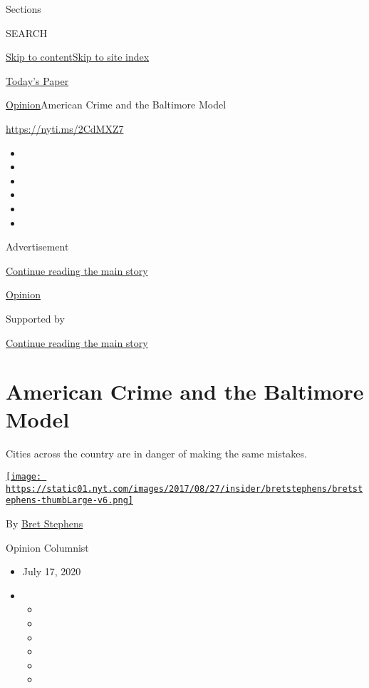 Sections

SEARCH

\protect\hyperlink{site-content}{Skip to
content}\protect\hyperlink{site-index}{Skip to site index}

\href{https://myaccount.nytimes.com/auth/login?response_type=cookie\&client_id=vi}{}

\href{https://www.nytimes.com/section/todayspaper}{Today's Paper}

\href{/section/opinion}{Opinion}\textbar{}American Crime and the
Baltimore Model

\href{https://nyti.ms/2CdMXZ7}{https://nyti.ms/2CdMXZ7}

\begin{itemize}
\item
\item
\item
\item
\item
\item
\end{itemize}

Advertisement

\protect\hyperlink{after-top}{Continue reading the main story}

\href{/section/opinion}{Opinion}

Supported by

\protect\hyperlink{after-sponsor}{Continue reading the main story}

\hypertarget{american-crime-and-the-baltimore-model}{%
\section{American Crime and the Baltimore
Model}\label{american-crime-and-the-baltimore-model}}

Cities across the country are in danger of making the same mistakes.

\href{https://www.nytimes.com/by/bret-stephens}{\texttt{[image: https://static01.nyt.com/images/2017/08/27/insider/bretstephens/bretstephens-thumbLarge-v6.png]}}

By \href{https://www.nytimes.com/by/bret-stephens}{Bret Stephens}

Opinion Columnist

\begin{itemize}
\item
  July 17, 2020
\item
  \begin{itemize}
  \item
  \item
  \item
  \item
  \item
  \item
  \end{itemize}
\end{itemize}

